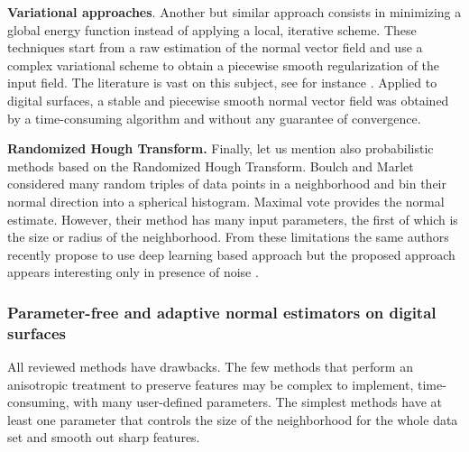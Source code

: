 \noindent\textbf{Variational approaches}. Another but similar approach
consists in minimizing a global energy function instead of applying a
local, iterative scheme. These techniques start from a raw estimation
of the normal vector field and use a complex variational scheme to obtain
a piecewise smooth regularization of the input field. The literature is
vast on this subject, see for instance \cite{zhang2015variational}. 
Applied to digital surfaces, a stable and piecewise smooth normal vector field
was obtained \cite{CoeurjollyFGL16} by a time-consuming algorithm and without
any guarantee of convergence. 


\noindent\textbf{Randomized Hough Transform.}
Finally, let us mention also probabilistic methods based on the Randomized Hough Transform.
Boulch and Marlet \cite{Boulch2012} considered many random triples of data points in a neighborhood
and bin their normal direction into a spherical histogram.
Maximal vote provides the normal estimate. However, their method has many input parameters,
the first of which is the size or radius of the neighborhood. From these limitations the same authors recently propose to use deep learning based approach but the proposed approach appears interesting only in presence of noise \cite{BoulchM16}.


\subsubsection{Parameter-free and adaptive normal estimators on digital surfaces}
\label{sec:estim:ds}

All reviewed methods have drawbacks. The few methods that perform an anisotropic
treatment to preserve features may be complex to implement, time-consuming, with
many user-defined parameters. The simplest methods have at least one parameter
that controls the size of the neighborhood for the whole data set and smooth out
sharp features.  

